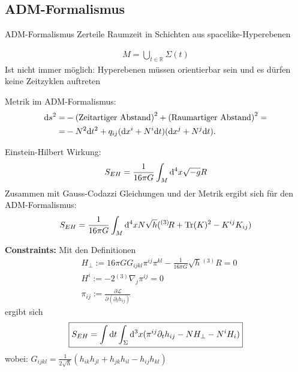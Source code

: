\documentclass[mathserif]{beamer}
\newcommand{\inHS}{{}^{(3)}\!}
\theoremstyle{definition}
\begin{document}
\subsection{ADM-Formalismus}
	\begin{frame}{ADM-Formalismus}
		Zerteile Raumzeit in Schichten aus spacelike-Hyperebenen
		\begin{center}
			
		\end{center}
		\begin{align}
			M=\bigcup_{t\in\mathbb{R}}\Sigma(t)
		\end{align}
		\pause
		Ist nicht immer möglich: Hyperebenen müssen orientierbar sein und es dürfen keine Zeitzyklen auftreten
	\end{frame}
	\begin{frame}
		Metrik im ADM-Formalismus:
		\begin{align}
			{\rm d}s^2=&-{\rm (Zeitartiger\ Abstand)}^2+{\rm (Raumartiger\ Abstand)}^2=\notag\\
			=&-N^2 {\rm d}t^2+q_{ij}({\rm d}x^i+N^i {\rm d}t)({\rm d}x^j+N^j {\rm d}t).
		\end{align}
	\end{frame}
	\begin{frame}
		Einstein-Hilbert Wirkung:
		\begin{align}
			S_{EH}=\frac{1}{16\pi G}\int_M{\rm d}^4x \sqrt{-g}R
		\end{align}
		\pause
		Zusammen mit Gauss-Codazzi Gleichungen und der Metrik ergibt sich für den ADM-Formalismus:
		\begin{align}
			S_{EH}=\frac{1}{16\pi G}\int_M{\rm d}^4x N\sqrt{h}(\inHS R+{\rm Tr}(K)^2-K^{ij}K_{ij})
		\end{align}
	\end{frame}
	\begin{frame}
		\textbf{Constraints:}
		Mit den Definitionen
		\begin{align}
			&H_{\perp}:=16\pi G G_{ijkl}\pi^{ij}\pi^{kl}-\frac{1}{16\pi G}\sqrt{h}\inHS R=0 \label{equ:constraint1}\\
			&H^i:=-2\inHS\nabla_j\pi^{ij}=0 \label{equ:constraint2}\\
			&\pi_{ij}:=\frac{\partial \mathcal{L}}{\partial(\partial_t h_{ij})}
		\end{align}
		ergibt sich
		\begin{align*}
			\boxed{S_{EH}=\int{\rm d}t\int_\Sigma {\rm d}^3x (\pi^{ij}\partial_t h_{ij}-NH_{\perp}-N^i H_i)}
		\end{align*}
		wobei: $G_{ijkl}=\frac{1}{2\sqrt{h}}(h_{ik}h_{jl}+h_{jk}h_{il}-h_{ij}h_{kl})$
	\end{frame}
\end{document}
